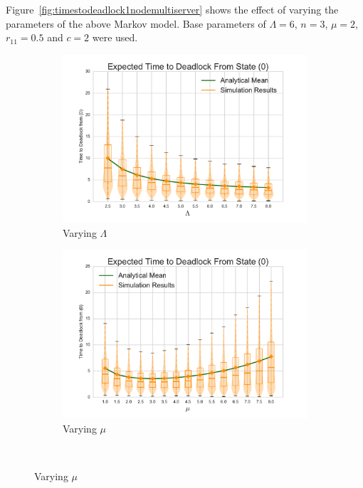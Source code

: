 \documentclass{article}
\numberwithin{equation}{section}
\begin{document}
Figure~\ref{fig:timestodeadlock1nodemultiserver} shows the effect of varying the parameters of the above Markov model.
Base parameters of $\Lambda = 6$, $n = 3$, $\mu = 2$, $r_{11} = 0.5$ and $c = 2$ were used.

\begin{figure}[!htbp]
  \begin{center}
  \begin{subfigure}[b]{0.35\textwidth}
    \includegraphics[width=\textwidth]{images/varyL_1Nms}
    \caption{Varying $\Lambda$}
    \label{fig:1Nms_L}
  \end{subfigure}
  \begin{subfigure}[b]{0.35\textwidth}
    \includegraphics[width=\textwidth]{images/varymu_1Nms}
    \caption{Varying $\mu$}
    \label{fig:1Nms_mu}
  \end{subfigure}\\

\end{center}
\end{figure}
\end{document}
